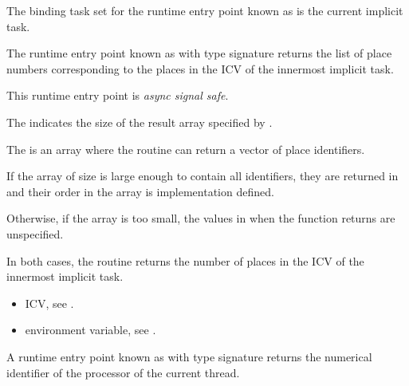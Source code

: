 The binding task set for 
the runtime entry point known as 
is the current implicit task.

\descr

The runtime entry point known as
 with type signature
 returns the list of place
numbers corresponding to the places in the 
ICV of the innermost implicit task.

This runtime entry point is \emph{async signal safe}.

\argdesc

The \callbackarg{}  indicates the size of the result
array specified by \callbackarg{} .

The \callbackarg{}  is an array where the routine can return
a vector of place identifiers.

\effect

If the array  of size  is
large enough to contain all identifiers, they are returned in
 and their order in the array is implementation
defined.

Otherwise, if the  array is too small, the values in  when the function returns are unspecified.

In both cases, the routine returns the number of places in the
 ICV of the innermost implicit task.

\crossreferences
\begin{itemize}
\item {} ICV, see
.

\item {} environment variable, see
.

\end{itemize}





\label{sec:ompt_get_proc_id_t}
\label{sec:ompt_get_proc_id}

\summary

A runtime entry point known as
 with type signature
 returns the numerical identifier
of the processor of the current thread.

